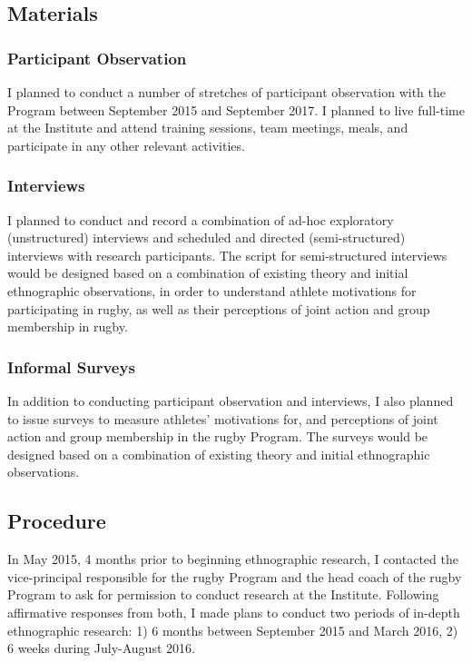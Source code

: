 \subsection{Materials}

  \subsubsection{Participant Observation}
  I planned to conduct a number of stretches of participant observation with the Program between September 2015 and September 2017.  I planned to live full-time at the Institute and attend training sessions, team meetings, meals, and participate in any other relevant activities.

  \subsubsection{Interviews}
  I planned to conduct and record a combination of ad-hoc exploratory (unstructured) interviews and scheduled and directed (semi-structured) interviews with research participants.  The script for semi-structured interviews would be designed based on a combination of existing theory and initial ethnographic observations, in order to  understand athlete motivations for participating in rugby, as well as their perceptions of joint action and group membership in rugby.

  \subsubsection{Informal Surveys}
  In addition to conducting participant observation and interviews, I also planned to issue surveys to measure athletes' motivations for, and perceptions of joint action and group membership in the rugby Program.  The surveys would be designed based on a combination of existing theory and initial ethnographic observations.


\subsection{Procedure}

In May 2015, 4 months prior to beginning ethnographic research, I contacted the vice-principal responsible for the rugby Program and the head coach of the rugby Program to ask for permission to conduct research at the Institute.  Following affirmative responses from both, I made plans to conduct two periods of in-depth ethnographic research: 1) 6 months between September 2015 and March 2016, 2) 6 weeks during July-August 2016.

